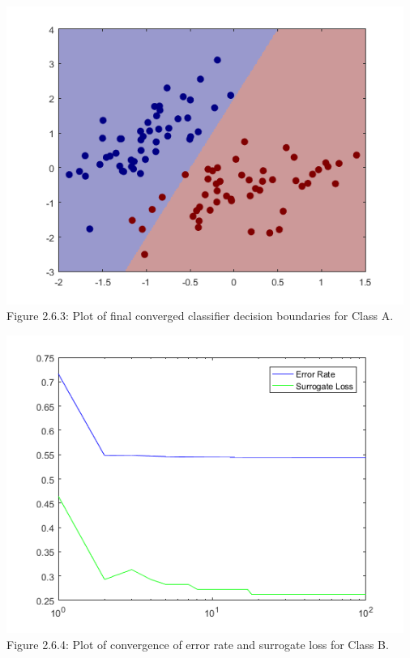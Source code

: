 \documentclass[]{report}   %
\begin{document}
\begin{center}
	\includegraphics[width=35em]{2_6_Figure_3.png}
	{Figure 2.6.3: Plot of final converged classifier decision boundaries for Class A.}
\end{center} 

\begin{center}
	\includegraphics[width=35em]{2_6_Figure_4.png}
	{Figure 2.6.4: Plot of convergence of error rate and surrogate loss for Class B.}
\end{center} 
\end{document}
